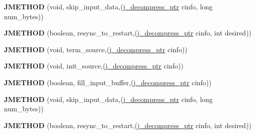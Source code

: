 \begin{DoxyCompactItemize}
\item 
\mbox{\label{structjpeg__source__mgr_a3e29df8ddadb0c15e54b69b5a7a10305}} 
{\bfseries J\+M\+E\+T\+H\+OD} (void, skip\+\_\+input\+\_\+data,(\hyperlink{structjpeg__decompress__struct}{j\+\_\+decompress\+\_\+ptr} cinfo, long num\+\_\+bytes))
\item 
\mbox{\label{structjpeg__source__mgr_a60a35ccd1fb8d954f34c0cdbf29ac010}} 
{\bfseries J\+M\+E\+T\+H\+OD} (boolean, resync\+\_\+to\+\_\+restart,(\hyperlink{structjpeg__decompress__struct}{j\+\_\+decompress\+\_\+ptr} cinfo, int desired))
\item 
\mbox{\label{structjpeg__source__mgr_a6c0683ce1166b9ee659b2d3aa1efb1c2}} 
{\bfseries J\+M\+E\+T\+H\+OD} (void, term\+\_\+source,(\hyperlink{structjpeg__decompress__struct}{j\+\_\+decompress\+\_\+ptr} cinfo))
\item 
\mbox{\label{structjpeg__source__mgr_af8fda02c19c9dc4e505daabb77c3ad81}} 
{\bfseries J\+M\+E\+T\+H\+OD} (void, init\+\_\+source,(\hyperlink{structjpeg__decompress__struct}{j\+\_\+decompress\+\_\+ptr} cinfo))
\item 
\mbox{\label{structjpeg__source__mgr_ab4a579b1f50108e2de73c7c0c1bbb9fd}} 
{\bfseries J\+M\+E\+T\+H\+OD} (boolean, fill\+\_\+input\+\_\+buffer,(\hyperlink{structjpeg__decompress__struct}{j\+\_\+decompress\+\_\+ptr} cinfo))
\item 
\mbox{\label{structjpeg__source__mgr_a3e29df8ddadb0c15e54b69b5a7a10305}} 
{\bfseries J\+M\+E\+T\+H\+OD} (void, skip\+\_\+input\+\_\+data,(\hyperlink{structjpeg__decompress__struct}{j\+\_\+decompress\+\_\+ptr} cinfo, long num\+\_\+bytes))
\item 
\mbox{\label{structjpeg__source__mgr_a60a35ccd1fb8d954f34c0cdbf29ac010}} 
{\bfseries J\+M\+E\+T\+H\+OD} (boolean, resync\+\_\+to\+\_\+restart,(\hyperlink{structjpeg__decompress__struct}{j\+\_\+decompress\+\_\+ptr} cinfo, int desired))
\item 
\mbox{\label{structjpeg__source__mgr_a6c0683ce1166b9ee659b2d3aa1efb1c2}} 

\end{DoxyCompactItemize}

